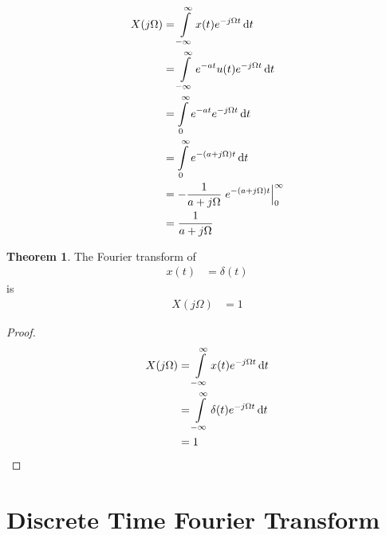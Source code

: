 \documentclass[titlepage, fleqn, a4paper, 12pt, twoside]{article}
\theoremstyle{definition}
\theoremstyle{theorem}
\newtheorem{theorem}{Theorem}
\begin{document}
\begin{solution}
	\begin{align*}
		X(j \Omega) &= \int\limits_{-\infty}^{\infty} x(t) e^{-j \Omega t} \dif t\\
		&= \int\limits_{-\infty}^{\infty} e^{-a t} u(t) e^{-j \Omega t} \dif t\\
		&= \int\limits_{0}^{\infty} e^{-a t} e^{-j \Omega t} \dif t\\
		&= \int\limits_{0}^{\infty} e^{-(a + j \Omega) t} \dif t\\
		&= -\frac{1}{a + j \Omega} \left. e^{-(a + j \Omega) t} \right|_{0}^{\infty}\\
		&= \frac{1}{a + j \Omega}
	\end{align*}
\end{solution}

\begin{theorem}
	The Fourier transform of
	\begin{align*}
		x(t) &= \delta(t)
	\end{align*}
	is
	\begin{align*}
		X(j \Omega) &= 1
	\end{align*}
\end{theorem}

\begin{proof}
	\begin{align*}
		X(j \Omega) &= \int\limits_{-\infty}^{\infty} x(t) e^{-j \Omega t} \dif t\\
		&= \int\limits_{-\infty}^{\infty} \delta(t) e^{-j \Omega t} \dif t\\
		&= 1
	\end{align*}
\end{proof}

\section{Discrete Time Fourier Transform}
\end{document}
